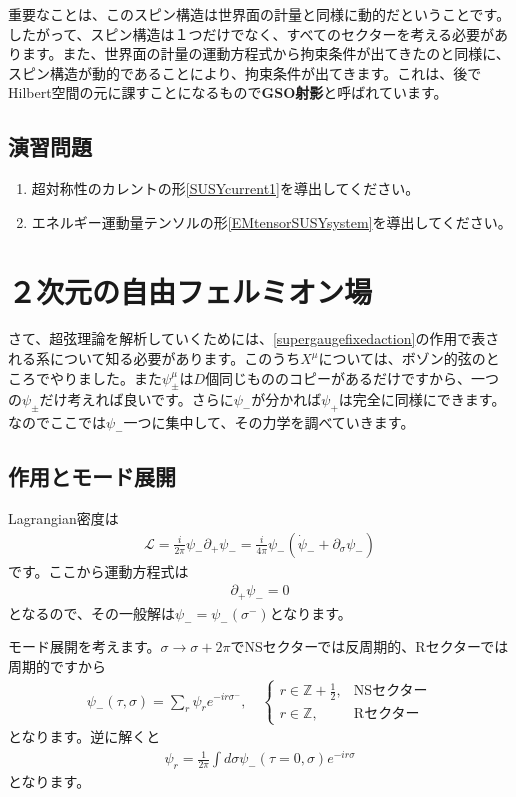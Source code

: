 \documentclass[report,paper=a4, fontsize=12pt, line_length=16cm, number_of_lines=34,dvipdfmx]{jlreq}
\numberwithin{equation}{chapter}
\numberwithin{equation}{section}
\newcommand{\Zb}{\mathbb{Z}}
\newcommand{\del}{\partial}
\newcommand{\kyou}[1]{{\sffamily \bfseries #1}}
\newcommand{\Lcal}{\mathcal{L}}
\begin{document}
重要なことは、このスピン構造は世界面の計量と同様に動的だということです。したがって、スピン構造は１つだけでなく、すべてのセクターを考える必要があります。また、世界面の計量の運動方程式から拘束条件が出てきたのと同様に、スピン構造が動的であることにより、拘束条件が出てきます。これは、後でHilbert空間の元に課すことになるもので\kyou{GSO射影}と呼ばれています。

\subsection*{演習問題}
\begin{enumerate}
  \item 超対称性のカレントの形\eqref{SUSYcurrent1}を導出してください。
  \item エネルギー運動量テンソルの形\eqref{EMtensorSUSYsystem}を導出してください。
\end{enumerate}

\section{２次元の自由フェルミオン場}
\label{sec:fermion}
さて、超弦理論を解析していくためには、\eqref{supergaugefixedaction}の作用で表される系について知る必要があります。このうち$X^{\mu}$については、ボゾン的弦のところでやりました。また$\psi^{\mu}_{\pm}$は$D$個同じもののコピーがあるだけですから、一つの$\psi_{\pm}$だけ考えれば良いです。さらに$\psi_{-}$が分かれば$\psi_{+}$は完全に同様にできます。なのでここでは$\psi_{-}$一つに集中して、その力学を調べていきます。

\subsection{作用とモード展開}
Lagrangian密度は
\begin{align}
  \Lcal=\frac{i}{2\pi}\psi_{-}\del_{+}\psi_{-}=\frac{i}{4\pi}\psi_{-}(\dot{\psi}_{-}+\del_{\sigma}\psi_{-})\label{MWfermionaction}
\end{align}
です。ここから運動方程式は
\begin{align}
  \del_{+}\psi_{-}=0
\end{align}
となるので、その一般解は$\psi_{-}=\psi_{-}(\sigma^{-})$となります。

モード展開を考えます。$\sigma\to\sigma+2\pi$でNSセクターでは反周期的、Rセクターでは周期的ですから
\begin{align}
  \psi_{-}(\tau,\sigma)=\sum_{r} \psi_{r} e^{-ir\sigma^{-}},\quad
  \begin{cases}
    r\in \Zb+\frac12,&\text{NSセクター}\\
    r\in \Zb,&\text{Rセクター}
  \end{cases}
  \label{psimodeexp}
\end{align}
となります。逆に解くと
\begin{align}
  \psi_{r}=\frac{1}{2\pi}\int d\sigma \psi_{-}(\tau=0,\sigma)e^{-ir\sigma}
\end{align}
となります。
\end{document}
